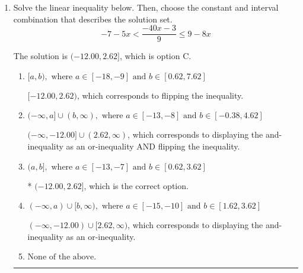 \documentclass{extbook}[14pt]
\newcommand{\litem}[1]{\item #1

\rule{\textwidth}{0.4pt}}
\begin{document}
\begin{enumerate}
{\begin{enumerate}[label=\Alph*.]
This describes the values less than 3 from 6
\item \( (-\infty, 3] \cup [9, \infty) \)

This describes the values no less than 3 from 6
\item \( (-\infty, 3) \cup (9, \infty) \)

This describes the values more than 3 from 6
\item \( [3, 9] \)

This describes the values no more than 3 from 6
\item \( \text{None of the above} \)

Options A-D described the values [more/less than] 3 units from 6, which is the reverse of what the question asked.
\end{enumerate}

\textbf{General Comment:} When thinking about this language, it helps to draw a number line and try points.
}
\litem{
Solve the linear inequality below. Then, choose the constant and interval combination that describes the solution set.
\[ -7 - 5 x < \frac{-40 x - 3}{9} \leq 9 - 8 x \]

The solution is \( (-12.00, 2.62] \), which is option C.\begin{enumerate}[label=\Alph*.]
\item \( [a, b), \text{ where } a \in [-18, -9] \text{ and } b \in [0.62, 7.62] \)

$[-12.00, 2.62)$, which corresponds to flipping the inequality.
\item \( (-\infty, a] \cup (b, \infty), \text{ where } a \in [-13, -8] \text{ and } b \in [-0.38, 4.62] \)

$(-\infty, -12.00] \cup (2.62, \infty)$, which corresponds to displaying the and-inequality as an or-inequality AND flipping the inequality.
\item \( (a, b], \text{ where } a \in [-13, -7] \text{ and } b \in [0.62, 3.62] \)

* $(-12.00, 2.62]$, which is the correct option.
\item \( (-\infty, a) \cup [b, \infty), \text{ where } a \in [-15, -10] \text{ and } b \in [1.62, 3.62] \)

$(-\infty, -12.00) \cup [2.62, \infty)$, which corresponds to displaying the and-inequality as an or-inequality.
\item \( \text{None of the above.} \)


\end{enumerate}

}
\end{enumerate}
\end{document}
